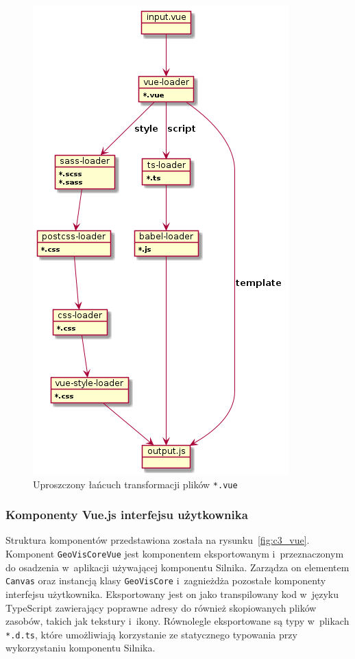 \begin{figure}
    \centering
    \includegraphics[scale=0.6]{diagrams/out/c3_webpack.png}
    \caption{Uproszczony łańcuch transformacji plików \texttt{*.vue}}
    \label{fig:c3_webpack}
\end{figure}

\subsubsection{Komponenty Vue.js interfejsu użytkownika}

Struktura komponentów przedstawiona została na rysunku~\ref{fig:c3_vue}. Komponent \texttt{GeoVisCoreVue} jest komponentem eksportowanym i~przeznaczonym do osadzenia w~aplikacji używającej komponentu Silnika. Zarządza on elementem \texttt{Canvas} oraz instancją klasy \texttt{GeoVisCore} i~zagnieżdża pozostałe komponenty interfejsu użytkownika. Eksportowany jest on jako transpilowany kod w~języku TypeScript zawierający poprawne adresy do również skopiowanych plików zasobów, takich jak tekstury i~ikony. Równolegle eksportowane są typy w~plikach \texttt{*.d.ts}, które umożliwiają korzystanie ze statycznego typowania przy wykorzystaniu komponentu Silnika.

